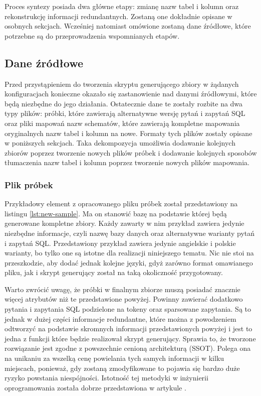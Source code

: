 Proces syntezy posiada dwa główne etapy: zmianę nazw tabel i kolumn oraz rekonstrukcję informacji redundantnych. Zostaną one dokładnie opisane w osobnych sekcjach. Wcześniej natomiast omówione zostaną dane źródłowe, które potrzebne są do przeprowadzenia wspomnianych etapów.

\subsection{Dane źródłowe}
Przed przystąpieniem do tworzenia skryptu generującego zbiory w żądanych konfiguracjach konieczne okazało się zastanowienie nad danymi źródłowymi, które będą niezbędne do jego działania. Ostatecznie dane te zostały rozbite na dwa typy plików: próbki, które zawierają alternatywne wersję pytań i zapytań SQL oraz pliki mapowań nazw schematów, które zawierają kompletne mapowania oryginalnych nazw tabel i kolumn na nowe. Formaty tych plików zostały opisane w poniższych sekcjach. Taka dekompozycja umożliwia dodawanie kolejnych zbiorów poprzez tworzenie nowych plików próbek i dodawanie kolejnych sposobów tłumaczenia nazw tabel i kolumn poprzez tworzenie nowych plików mapowania.

\subsubsection{Plik próbek}
Przykładowy element z opracowanego pliku próbek został przedstawiony na listingu \ref{lst:new-sample}. Ma on stanowić bazę na podstawie której będą generowane kompletne zbiory. Każdy zawarty w nim przykład zawiera jedynie niezbędne informacje, czyli nazwę bazy danych oraz alternatywne warianty pytań i zapytań SQL. Przedstawiony przykład zawiera jedynie angielskie i polskie warianty, bo tylko one są istotne dla realizacji niniejszego tematu. Nic nie stoi na przeszkodzie, aby dodać jednak kolejne języki, gdyż zarówno format omawianego pliku, jak i skrypt generujący został na taką okoliczność przygotowany.

\begin{minipage}{\linewidth}

\end{minipage}

Warto zwrócić uwagę, że próbki w finalnym zbiorze muszą posiadać znacznie więcej atrybutów niż te przedstawione powyżej. Powinny zawierać dodatkowo pytania i zapytania SQL podzielone na tokeny oraz sparsowane zapytania. Są to jednak w dużej części informacje redundantne, które można z powodzeniem odtworzyć na podstawie skromnych informacji przedstawionych powyżej i jest to jedna z funkcji które będzie realizował skrypt generujący. Sprawia to, że tworzone rozwiązanie jest zgodne z powszechnie cenioną architekturą  (SSOT). Polega ona na unikaniu za wszelką cenę powielania tych samych informacji w kilku miejscach, ponieważ, gdy zostaną zmodyfikowane to pojawia się bardzo duże ryzyko powstania niespójności. Istotność tej metodyki w inżynierii oprogramowania została dobrze przedstawiona w artykule  .

